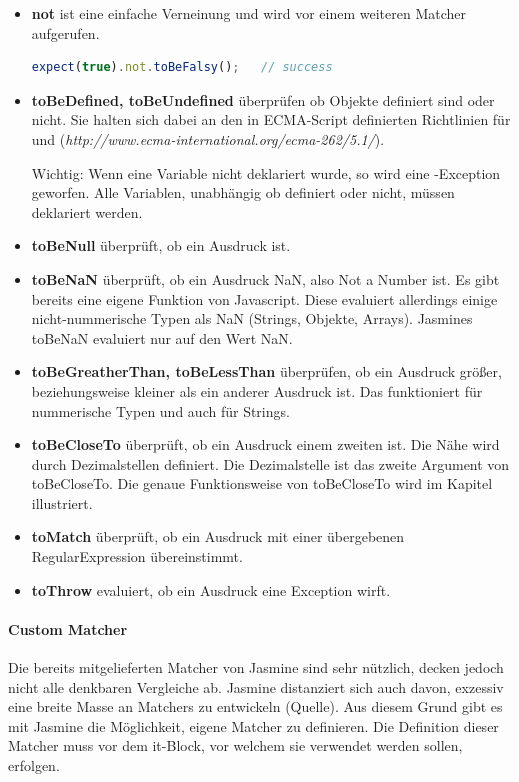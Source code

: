 \begin{itemize}
  \item \textbf{not} ist eine einfache Verneinung und wird vor einem weiteren Matcher aufgerufen.
  \begin{lstlisting}[language=JavaScript]
    expect(true).not.toBeFalsy();   // success
  \end{lstlisting}

  \item \textbf{toBeDefined, toBeUndefined} überprüfen ob Objekte definiert sind oder nicht. Sie halten sich dabei an den in ECMA-Script definierten Richtlinien für  und  (\textit{http://www.ecma-international.org/ecma-262/5.1/}).

  Wichtig: Wenn eine Variable nicht deklariert wurde, so wird eine -Exception geworfen. Alle Variablen, unabhängig ob definiert oder nicht, müssen deklariert werden.

  \item \textbf{toBeNull} überprüft, ob ein Ausdruck  ist.

  \item \textbf{toBeNaN} überprüft, ob ein Ausdruck NaN, also Not a Number ist.
  Es gibt bereits eine eigene  Funktion von Javascript. Diese evaluiert allerdings einige nicht-nummerische Typen als NaN (Strings, Objekte, Arrays). Jasmines toBeNaN evaluiert nur auf den Wert NaN.

  \item \textbf{toBeGreatherThan, toBeLessThan} überprüfen, ob ein Ausdruck größer, beziehungsweise kleiner als ein anderer Ausdruck ist. Das funktioniert für nummerische Typen und auch für Strings.

  \item \textbf{toBeCloseTo} überprüft, ob ein Ausdruck  einem zweiten ist. Die Nähe wird durch Dezimalstellen definiert. Die Dezimalstelle ist das zweite Argument von toBeCloseTo. Die genaue Funktionsweise von toBeCloseTo wird im Kapitel  illustriert.

  \item \textbf{toMatch} überprüft, ob ein Ausdruck mit einer übergebenen RegularExpression übereinstimmt.

  \item \textbf{toThrow} evaluiert, ob ein Ausdruck eine Exception wirft.


\end{itemize}

\paragraph{Custom Matcher}
Die bereits mitgelieferten Matcher von Jasmine sind sehr nützlich, decken jedoch nicht alle denkbaren Vergleiche ab. Jasmine distanziert sich auch davon, exzessiv eine breite Masse an Matchers zu entwickeln (Quelle). Aus diesem Grund gibt es mit Jasmine die Möglichkeit, eigene Matcher zu definieren. Die Definition dieser Matcher muss vor dem it-Block, vor welchem sie verwendet werden sollen, erfolgen.

